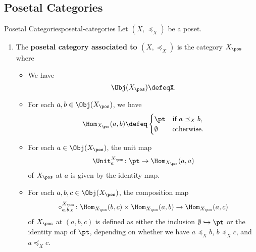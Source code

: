 \subsection{Posetal Categories}\label{subsection-posetal-categories}
\begin{definition}{Posetal Categories}{posetal-categories}%
    Let $(X,\preceq_{X})$ be a poset.
    \begin{enumerate}
        \item\label{posetal-categories-posetal-category-associated-to-poset}The \textbf{posetal category associated to $(X,\preceq_{X})$} is the category $X_{\pos}$ where
            \begin{itemize}
                \item{}We have
                    \[
                        \Obj(X_{\pos})%
                        \defeq%
                        X.%
                    \]%
                \item{}For each $a,b\in\Obj(X_{\pos})$, we have
                    \[
                        \Hom_{X_{\pos}}(a,b)%
                        \defeq%
                        \begin{cases}
                            \pt       &\text{if $a\preceq_{X}b$},\\%
                            \emptyset &\text{otherwise.}%
                        \end{cases}
                    \]%
                \item{}For each $a\in\Obj(X_{\pos})$, the unit map
                    \[%
                        \Unit^{X_{\pos}}_{a}%
                        \colon%
                        \pt%
                        \to%
                        \Hom_{X_{\pos}}(a,a)%
                    \]%
                    of $X_{\pos}$ at $a$ is given by the identity map.
                \item{}For each $a,b,c\in\Obj(X_{\pos})$, the composition map
                    \[
                        \circ^{X_{\pos}}_{a,b,c}%
                        \colon%
                        \Hom_{X_{\pos}}(b,c)%
                        \times%
                        \Hom_{X_{\pos}}(a,b)%
                        \to%
                        \Hom_{X_{\pos}}(a,c)%
                    \]%
                    of $X_{\pos}$ at $(a,b,c)$ is defined as either the inclusion $\emptyset\hookrightarrow\pt$ or the identity map of $\pt$, depending on whether we have $a\preceq_{X}b$, $b\preceq_{X}c$, and $a\preceq_{X}c$.

\end{itemize}
\end{enumerate}
\end{definition}
